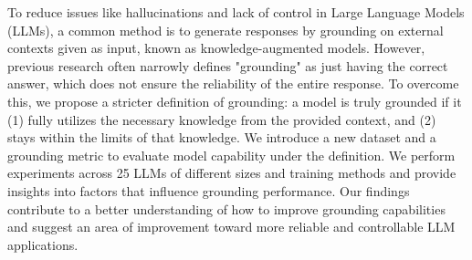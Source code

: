 To reduce issues like hallucinations and lack of control in Large Language Models (LLMs), a common method is to generate responses by grounding on external contexts given as input, known as knowledge-augmented models. However, previous research often narrowly defines "grounding" as just having the correct answer, which does not ensure the reliability of the entire response. To overcome this, we propose a stricter definition of grounding: a model is truly grounded if it (1) fully utilizes the necessary knowledge from the provided context, and (2) stays within the limits of that knowledge. We introduce a new dataset and a grounding metric to evaluate model capability under the definition. We perform experiments across 25 LLMs of different sizes and training methods and provide insights into factors that influence grounding performance. Our findings contribute to a better understanding of how to improve grounding capabilities and suggest an area of improvement toward more reliable and controllable LLM applications.